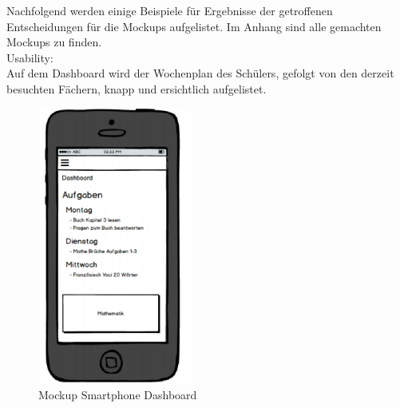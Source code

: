 Nachfolgend werden einige Beispiele für Ergebnisse der getroffenen Entscheidungen für die Mockups aufgelistet. Im Anhang sind alle gemachten Mockups zu finden. \\ %

Usability: \\
Auf dem Dashboard wird der Wochenplan des Schülers, gefolgt von den derzeit besuchten Fächern, knapp und ersichtlich aufgelistet. \\
\begin{minipage}{\textwidth}
	\begin{figure}[H]
	\centering
		\includegraphics[width=5cm, keepaspectratio]{images/Mockups/Dashboard_Smartphone.png}
		\caption{Mockup Smartphone Dashboard}
	\end{figure}
\end{minipage}


